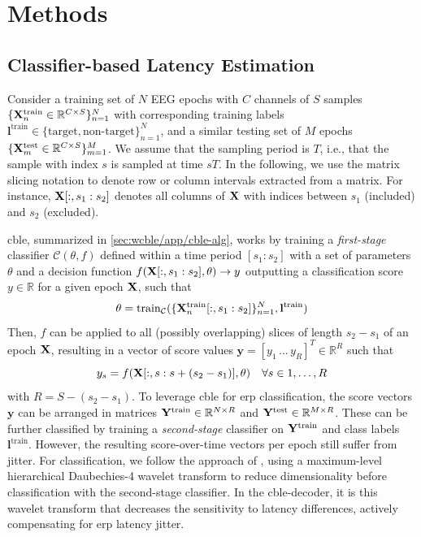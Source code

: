 \section{Methods}
\label{sec:wcble/methods}

\subsection{Classifier-based Latency Estimation}
\label{sec:wcble/methods/cble}

Consider a training set of $N$ EEG epochs with $C$ channels of $S$
samples $\{\mathbf{X}_n^\mathrm{train} \in \mathbb{R}^{C\times S}\}_{n=1}^N$
with corresponding training labels $\mathbf{l^\mathrm{train}} \in \{\mathrm{target},
	\textrm{non-target}\}_{n=1}^N$, and a
similar testing set of $M$ epochs $\{\mathbf{X}_m^\mathrm{test} \in
	\mathbb{R}^{C\times S}\}_{m=1}^M$.
We assume that the sampling period is $T$, i.e., that the sample with index $s$ is sampled at time $sT$.
In the following, we use the matrix slicing notation to denote row or column intervals extracted from a matrix.
For instance, $\mathbf{X}[:,s_1:s_2]$ denotes all columns of $\mathbf{X}$ with indices between $s_1$ (included) and $s_2$ (excluded).

\Ac{cble}, summarized in \cref{sec:wcble/app/cble-alg}, works by training a
\textit{first-stage} classifier $\mathcal{C}(\theta,f)$
defined within a time period $[s_1:s_2]$ with a set of parameters $\theta$ and a
decision function $f(\mathbf{X}[:,s_1:s_2],\theta) \rightarrow
y$ outputting a classification score $y\in\mathbb{R}$ for a given epoch $\mathbf{X}$,
such that
\begin{equation}
  \theta = \mathrm{train}_\mathcal{C}(\{\mathbf{X}_n^\mathrm{train}[:,s_1:s_2]\}_{n=1}^N,\mathbf{l}^\mathrm{train})
  \label{eq:cble-train}
\end{equation}
Then,
$f$ can be applied to all (possibly overlapping) slices of length $s_2-s_1$ of
an epoch $\mathbf{X}$, resulting in a vector of score values
$\mathbf{y}=[y_1\,\ldots\,y_R]^T \in\mathbb{R}^R$ such that
\begin{equation}
  y_s = f(\mathbf{X}[:,s:s+(s_2-s_1)],\theta)\quad \forall s\in 1,\ldots,R
	\label{eq:score}
\end{equation}
with $R = S-(s_2-s_1)$.
To leverage \ac{cble} for \ac{erp} classification, the score vectors $\mathbf{y}$ can be
arranged in matrices $\mathbf{Y}^\mathrm{train}\in\mathbb{R}^{N\times R}$ and $\mathbf{Y}^\mathrm{test}\in\mathbb{R}^{M\times R}$.
These can be further classified by training a \textit{second-stage} classifier on
$\mathbf{Y}^\mathrm{train}$ and class labels $\mathbf{l}^\mathrm{train}$.
However, the resulting score-over-time vectors per epoch still suffer from jitter.
For classification, we follow the approach of \cite{Mowla2017}, using a
maximum-level hierarchical Daubechies-4 wavelet transform to reduce
dimensionality before classification with the second-stage classifier.
In the \ac{cble}-decoder, it is this wavelet transform that decreases the sensitivity
to latency differences, actively compensating for \ac{erp} latency jitter.

